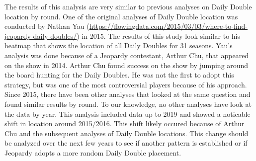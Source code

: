 \documentclass[]{article}
\begin{document}
The results of this analysis are very similar to previous analyses on
Daily Double location by round. One of the original analyses of Daily
Double location was conducted by Nathan Yau
(\url{https://flowingdata.com/2015/03/03/where-to-find-jeopardy-daily-doubles/})
in 2015. The results of this study look similar to his heatmap that
shows the location of all Daily Doubles for 31 seasons. Yau's analysis
was done because of a Jeopardy contestant, Arthur Chu, that appeared on
the show in 2014. Arthur Chu found success on the show by jumping around
the board hunting for the Daily Doubles. He was not the first to adopt
this strategy, but was one of the most controversial players because of
his approach. Since 2015, there have been other analyses that looked at
the same question and found similar results by round. To our knowledge,
no other analyses have look at the data by year. This analysis included
data up to 2019 and showed a noticable shift in location around
2015/2016. This shift likely occured because of Arthur Chu and the
subsequent analyses of Daily Double locations. This change should be
analyzed over the next few years to see if another pattern is
established or if Jeopardy adopts a more random Daily Double placement.
\end{document}

